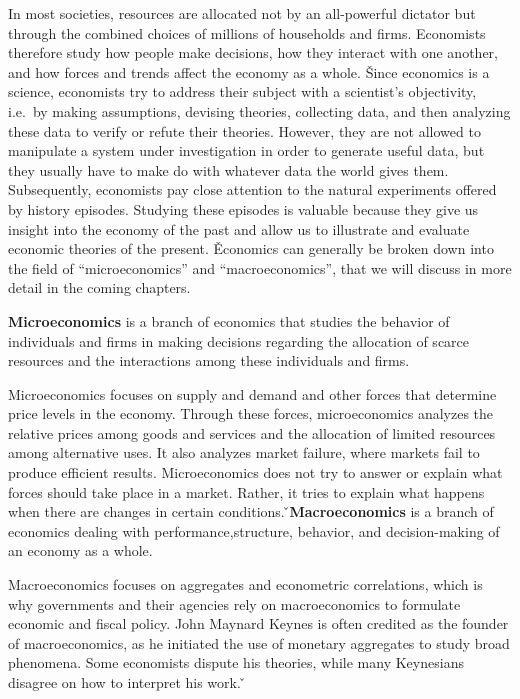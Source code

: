 In most societies, resources are allocated not by an all-powerful dictator but through the combined choices of millions
of households and firms. Economists therefore study how people make decisions, how they interact with one another, and
how forces and trends affect the economy as a whole. \v

Since economics is a science, economists try to address their subject with a scientist's objectivity, i.e.\ by making
assumptions, devising theories, collecting data, and then analyzing these data to verify or refute their theories.
However, they are not allowed to manipulate a system under investigation in order to generate useful data, but they
usually have to make do with whatever data the world gives them. Subsequently, economists pay close attention to the
natural experiments offered by history episodes. Studying these episodes is valuable because they give us insight into
the economy of the past and allow us to illustrate and evaluate economic theories of the present. \v

Economics can generally be broken down into the field of ``microeconomics'' and ``macroeconomics'', that we will
discuss in more detail in the coming chapters.

\bd[Microeconomics]
\textbf{Microeconomics} is a branch of economics that studies the behavior of individuals and firms in making decisions
regarding the allocation of scarce resources and the interactions among these individuals and firms.
\ed

Microeconomics focuses on supply and demand and other forces that determine price levels in the economy. Through these
forces, microeconomics analyzes the relative prices among goods and services and the allocation of limited resources
among alternative uses. It also analyzes market failure, where markets fail to produce efficient results. Microeconomics
does not try to answer or explain what forces should take place in a market. Rather, it tries to explain what happens
when there are changes in certain conditions. \v

\bd[Macroeconomics]
\textbf{Macroeconomics} is a branch of economics dealing with performance,structure, behavior, and decision-making of an
economy as a whole.
\ed

Macroeconomics focuses on aggregates and econometric correlations, which is why governments and their agencies rely
on macroeconomics to formulate economic and fiscal policy. John Maynard Keynes is often credited as the founder of
macroeconomics, as he initiated the use of monetary aggregates to study broad phenomena. Some economists dispute his
theories, while many Keynesians disagree on how to interpret his work. \v


